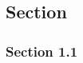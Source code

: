 \documentclass{article}
\begin{document}
\subsection{Section}
\subsubsection{Section 1.1}
\end{document}
